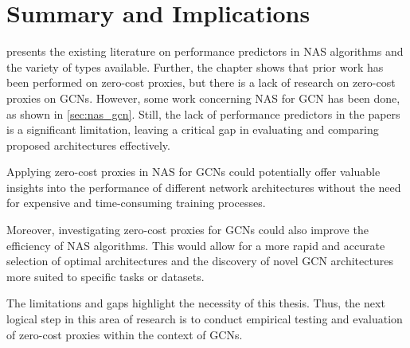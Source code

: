 \section{Summary and Implications}

 presents the existing literature on performance predictors in \gls{NAS} algorithms and the variety of types available. Further, the chapter shows that prior work has been performed on zero-cost proxies, but there is a lack of research on zero-cost proxies on \glspl{GCN}. However, some work concerning \gls{NAS} for \gls{GCN} has been done, as shown in \cref{sec:nas_gcn}. Still, the lack of performance predictors in the papers is a significant limitation, leaving a critical gap in evaluating and comparing proposed architectures effectively. 

Applying zero-cost proxies in \gls{NAS} for \glspl{GCN} could potentially offer valuable insights into the performance of different network architectures without the need for expensive and time-consuming training processes.

Moreover, investigating zero-cost proxies for \glspl{GCN} could also improve the efficiency of \gls{NAS} algorithms. This would allow for a more rapid and accurate selection of optimal architectures and the discovery of novel \gls{GCN} architectures more suited to specific tasks or datasets.

The limitations and gaps highlight the necessity of this thesis. Thus, the next logical step in this area of research is to conduct empirical testing and evaluation of zero-cost proxies within the context of \glspl{GCN}.

